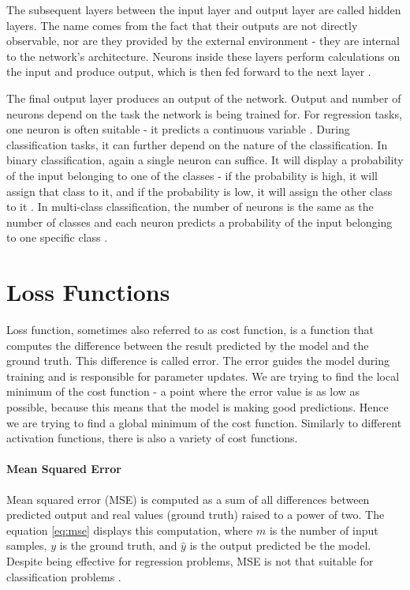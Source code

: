The subsequent layers between the input layer and output layer are called hidden layers. The name comes from the fact that their outputs are not directly observable, nor are they provided by the external environment - they are internal to the network's architecture. Neurons inside these layers perform calculations on the input and produce output, which is then fed forward to the next layer \cite{LeCun2015}.

The final output layer produces an output of the network. Output and number of neurons depend on the task the network is being trained for. For regression tasks, one neuron is often suitable - it predicts a continuous variable \cite{Goodfellow2016}. During classification tasks, it can further depend on the nature of the classification. In binary classification, again a single neuron can suffice. It will display a probability of the input belonging to one of the classes - if the probability is high, it will assign that class to it, and if the probability is low, it will assign the other class to it \cite{Goodfellow2016}. In multi-class classification, the number of neurons is the same as the number of classes and each neuron predicts a probability of the input belonging to one specific class \cite{Goodfellow2016}.

\section{Loss Functions}
Loss function, sometimes also referred to as cost function, is a function that computes the difference between the result predicted by the model and the ground truth. This difference is called error. The error guides the model during training and is responsible for parameter updates. We are trying to find the local minimum of the cost function - a point where the error value is as low as possible, because this means that the model is making good predictions. Hence we are trying to find a global minimum of the cost function. Similarly to different activation functions, there is also a variety of cost functions.

\paragraph{Mean Squared Error}
Mean squared error (MSE) is computed as a sum of all differences between predicted output and real values (ground truth) raised to a power of two. The equation \ref{eq:mse} displays this computation, where $m$ is the number of input samples, $y$ is the ground truth, and $\hat{y}$ is the output predicted be the model. Despite being effective for regression problems, MSE is not that suitable for classification problems \cite{Santosh2022-2}.

